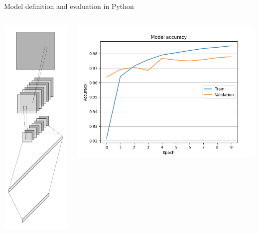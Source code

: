 \documentclass[xcolor=table]{beamer}
\begin{document}
\begin{frame}{Model definition and evaluation in Python}
\begin{columns}[T]
\begin{column}{0.3\columnwidth}
      \includegraphics[scale=0.3]{Images/cnn-vertical.png}
    \end{column}
    \begin{column}{0.5\columnwidth}
      \includegraphics[scale=0.3]{Images/accuracy.png}

\end{column}
\end{columns}
\end{frame}
\end{document}
